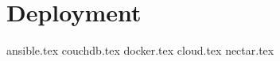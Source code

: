 \section{Deployment} \label{deployment}
{ansible.tex}
{couchdb.tex}
{docker.tex}
{cloud.tex}
{nectar.tex}